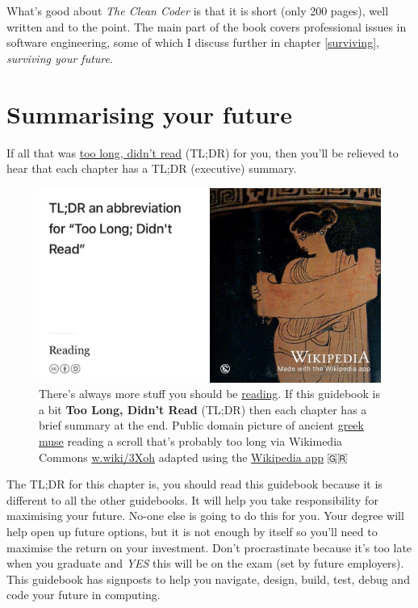 \documentclass[
]{book}
\begin{document}
What's good about \emph{The Clean Coder} is that it is short (only 200 pages), well written and to the point. The main part of the book covers professional issues in software engineering, some of which I discuss further in chapter \ref{surviving}, \emph{surviving your future}.

\hypertarget{tldr1}{%
\section{Summarising your future}\label{tldr1}}

If all that was \href{https://en.wiktionary.org/wiki/too_long;_didn\%27t_read}{too long, didn't read} (TL;DR) for you, then you'll be relieved to hear that each chapter has a TL;DR (executive) summary.

\begin{figure}

{\centering \includegraphics[width=1\linewidth]{images/tldr} 

}

\caption{There's always more stuff you should be \href{https://en.wikipedia.org/wiki/Reading}{reading}. If this guidebook is a bit \textbf{Too Long, Didn't Read} (TL;DR) then each chapter has a brief summary at the end. Public domain picture of ancient \href{https://en.wikipedia.org/wiki/Muses}{greek muse} reading a scroll that's probably too long via Wikimedia Commons \href{https://w.wiki/3Xoh}{w.wiki/3Xoh} adapted using the \href{https://apps.apple.com/us/app/wikipedia/id324715238}{Wikipedia app} 🇬🇷}\label{fig:tldr-fig}
\end{figure}



The TL;DR for this chapter is, you should read this guidebook because it is different to all the other guidebooks. It will help you take responsibility for maximising your future. No-one else is going to do this for you. Your degree will help open up future options, but it is not enough by itself so you'll need to maximise the return on your investment. Don't procrastinate because it's too late when you graduate and \emph{YES} this will be on the exam (set by future employers). This guidebook has signposts to help you navigate, design, build, test, debug and code your future in computing.
\end{document}

